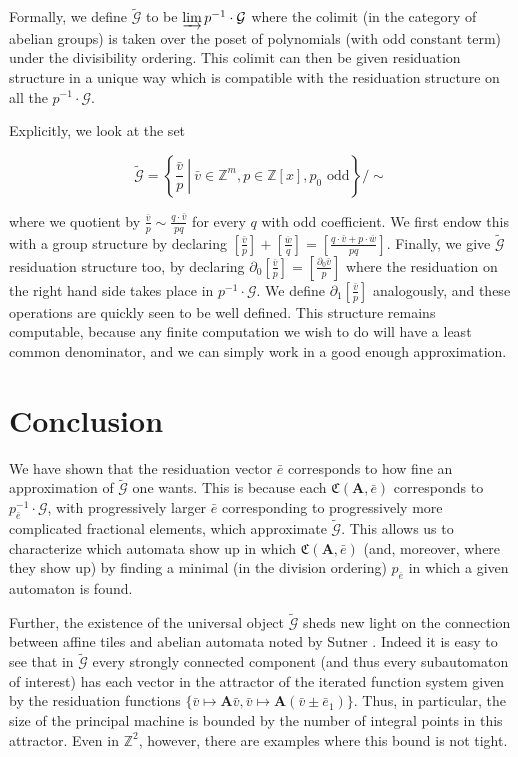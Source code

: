 \documentclass[final]{ws-ijac}
\newcommand{\G}{\mathcal{G}}
\newcommand{\C}{\mathfrak{C}(\Am,\e)}
\newcommand{\Z}{\mathbb{Z}}
\newcommand{\2}{\textbf{2}}
\newcommand{\Am}{\textbf{A}}
\newcommand{\del}{\partial}
\newcommand{\vv}{\bar{v}}
\newcommand{\e}{\bar{e}}
\begin{document}
Formally, we define $\widetilde{\G}$ to be $\varinjlim p^{-1} \cdot \G$ 
where the colimit (in the category of abelian groups) is taken over the poset 
of polynomials (with odd constant term) under the divisibility ordering. This 
colimit can then be given residuation structure in a unique way which is 
compatible with the residuation structure on all the $p^{-1} \cdot \G$.

Explicitly, we look at the set 

\[ 
  \widetilde{\G} = \left \{ \left . \frac{\vv}{p} \ \right | \  \vv \in \Z^m, p \in \Z[x], p_0 \text{ odd} \right \} / \sim
\]

where we quotient by $\frac{\vv}{p} \sim \frac{q \cdot \vv}{pq}$ for every
$q$ with odd coefficient. We first endow this with a group structure by
declaring $[\frac{\vv}{p}] + [\frac{\overline{w}}{q}] = 
[\frac{q \cdot \vv + p \cdot \overline{w}}{pq}]$. Finally, we give
$\widetilde{\G}$ residuation structure too, by declaring 
$\del_0 [\frac{\vv}{p}] = [\frac{\del_0 \vv}{p}]$ where the residuation
on the right hand side takes place in $p^{-1} \cdot \G$. We define 
$\del_1 [\frac{\vv}{p}]$ analogously, and these operations are quickly seen
to be well defined.  This structure remains computable, because any finite 
computation we wish to do will have a least common denominator, and we can
simply work in a good enough approximation.

\section{Conclusion}
We have shown that the residuation vector $\e$ corresponds to how fine an
approximation of $\widetilde{\G}$ one wants. This is because each $\C$ 
corresponds to $p_{\e}^{-1} \cdot \G$, with progressively larger $\e$ 
corresponding to progressively more complicated fractional elements, which
approximate $\widetilde{\G}$. This allows us to characterize which automata
show up in which $\C$ (and, moreover, where they show up) by finding a minimal 
(in the division ordering) $p_{\e}$ in which a given automaton is found.

Further, the existence of the universal object $\widetilde{\G}$ 
sheds new light on the connection between affine tiles
\cite{LagariasWang96:tiles,LagariasWang97:integral_tiles}
and abelian automata noted by Sutner
\cite{Sutner18:abelian_automata}. 
Indeed it is easy to see that in 
$\widetilde{\G}$ every strongly connected component 
(and thus every subautomaton of interest) has each vector in the attractor 
of the iterated function system given by the residuation functions 
$\{ \vv \mapsto \Am \vv, \vv \mapsto \Am (\vv \pm \e_1) \}$.
Thus, in particular, the size of the principal machine is bounded by the
number of integral points in this attractor. Even in $\Z^2$, however, there
are examples where this bound is not tight.
\end{document}
